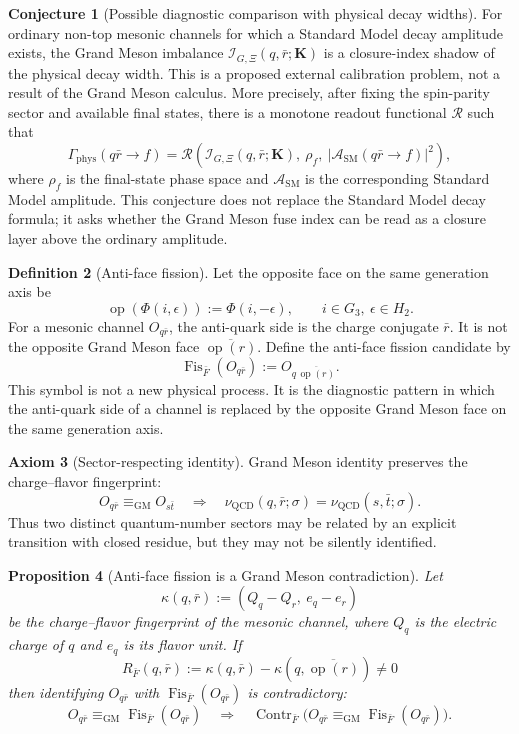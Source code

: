 \documentclass[11pt]{article}
\theoremstyle{definition}
\newtheorem{definition}{Definition}
\newtheorem{axiom}[definition]{Axiom}
\newtheorem{conjecture}[definition]{Conjecture}
\theoremstyle{plain}
\newtheorem{proposition}[definition]{Proposition}
\DeclareMathOperator{\Contr}{Contr}
\DeclareMathOperator{\op}{op}
\DeclareMathOperator{\Fis}{Fis}
\begin{document}
\begin{conjecture}[Possible diagnostic comparison with physical decay widths]
For ordinary non-top mesonic channels for which a Standard Model decay
amplitude exists, the Grand Meson imbalance
\(\mathcal I_{G,\Xi}(q,\bar r;\mathbf K)\) is a closure-index shadow of the
physical decay width.  This is a proposed external calibration problem, not
a result of the Grand Meson calculus.  More precisely, after fixing the spin-parity sector
and available final states, there is a monotone readout functional
\(\mathcal R\) such that
\[
  \Gamma_{\mathrm{phys}}(q\bar r\to f)
  =
  \mathcal R\!\left(
    \mathcal I_{G,\Xi}(q,\bar r;\mathbf K),\
    \rho_f,\
    |\mathcal A_{\mathrm{SM}}(q\bar r\to f)|^2
  \right),
\]
where \(\rho_f\) is the final-state phase space and
\(\mathcal A_{\mathrm{SM}}\) is the corresponding Standard Model amplitude.
This conjecture does not replace the Standard Model decay formula; it asks
whether the Grand Meson fuse index can be read as a closure layer above the
ordinary amplitude.
\end{conjecture}

\begin{definition}[Anti-face fission]
Let the opposite face on the same generation axis be
\[
  \op(\Phi(i,\epsilon)):=\Phi(i,-\epsilon),
  \qquad i\in G_3,\ \epsilon\in H_2 .
\]
For a mesonic channel \(O_{q\bar r}\), the anti-quark side is the charge
conjugate \(\bar r\).  It is not the opposite Grand Meson face
\(\overline{\op(r)}\).  Define the anti-face fission candidate by
\[
  \Fis_{\bar F}(O_{q\bar r})
  :=
  O_{q\,\overline{\op(r)}} .
\]
This symbol is not a new physical process.  It is the diagnostic pattern in
which the anti-quark side of a channel is replaced by the opposite
Grand Meson face on the same generation axis.
\end{definition}

\begin{axiom}[Sector-respecting identity]
Grand Meson identity preserves the charge--flavor fingerprint:
\[
  O_{q\bar r}\equiv_{\mathrm{GM}} O_{s\bar t}
  \quad\Longrightarrow\quad
  \nu_{\mathrm{QCD}}(q,\bar r;\sigma)
  =
  \nu_{\mathrm{QCD}}(s,\bar t;\sigma).
\]
Thus two distinct quantum-number sectors may be related by an explicit
transition with closed residue, but they may not be silently identified.
\end{axiom}

\begin{proposition}[Anti-face fission is a Grand Meson contradiction]
Let
\[
  \kappa(q,\bar r):=(Q_q-Q_r,\ e_q-e_r)
\]
be the charge--flavor fingerprint of the mesonic channel, where \(Q_q\) is
the electric charge of \(q\) and \(e_q\) is its flavor unit.  If
\[
  R_{\bar F}(q,\bar r)
  :=
  \kappa(q,\bar r)-\kappa(q,\overline{\op(r)})
  \ne 0
\]
then identifying \(O_{q\bar r}\) with \(\Fis_{\bar F}(O_{q\bar r})\) is
contradictory:
\[
  O_{q\bar r}\equiv_{\mathrm{GM}} \Fis_{\bar F}(O_{q\bar r})
  \quad\Longrightarrow\quad
  \Contr_{\bar F}
  \bigl(O_{q\bar r}\equiv_{\mathrm{GM}}\Fis_{\bar F}(O_{q\bar r})\bigr).
\]
\end{proposition}
\end{document}
